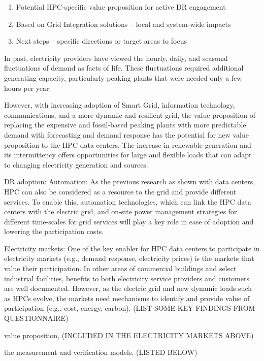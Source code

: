 %
\begin{enumerate}
\item Potential HPC-specific value proposition for active DR engagement
\item Based on Grid Integration solutions -- local and system-wide impacts
\item Next steps -- specific directions or target areas to focus
\end{enumerate}

In past, electricity providers have viewed the hourly, daily, and seasonal
fluctuations of demand as facts of life. These fluctuations required
additional generating capacity, particularly peaking plants that were needed
only a few hours per year. 

However, with increasing adoption of Smart Grid, information technology, communications, and a more dynamic and resilient grid, 
the value proposition of replacing the expensive and fossil-based peaking plants with more predictable demand with forecasting and demand response has the potential for new value proposition to the HPC data centers. 
The increase in renewable generation and its intermittency offers opportunities for large and flexible loads that can adapt to changing electricity generation and sources.

DR adoption: 
Automation: 
%
As the previous research as shown with data centers, HPC can also be considered as a resource to the grid and provide different services.
To enable this, automation technologies, which can link the HPC data centers with the electric grid, 
and on-site power management strategies for different time-scales for grid services will play a key role in ease of adoption and lowering the participation costs.

Electricity markets: 
One of the key enabler for HPC data centers to participate in electricity markets (e.g., demand response, electricity prices)
is the markets that value their participation. 
In other areas of commercial buildings and select industrial facilities, benefits to both electricity service providers and customers are well documented.
However, as the electric grid and new dynamic loads such as HPCs evolve, the markets need mechanisms to identify and provide value of participation (e.g., cost, energy, carbon). 
(LIST SOME KEY FINDINGS FROM QUESTIONNAIRE)

value proposition, (INCLUDED IN THE ELECTRICITY MARKETS ABOVE)

the measurement and verification models, (LISTED BELOW)

